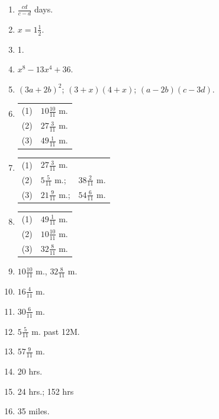 \documentclass{book}
\begin{document}
\begin{enumerate}
\item  $\displaystyle \frac{cd}{c - d}$ days.

\item  $x = 1\frac{1}{2}$.

\item  1.

\item  $x^8 - 13x^4 + 36$.

\item  $(3a + 2b)^2$; $(3 + x)(4 + x)$; $(a - 2b)(c - 3d)$.

\item \begin{tabular}{ll}(1)& $10\frac{10}{11}$ m.   \\
    (2)& $27\frac{3}{11}$ m.   \\
    (3) &$49\frac{1}{11}$ m.
    \end{tabular}

\item \begin{tabular}{lll} (1) &$27\frac{3}{11}$ m.   \\
    (2)& $5\frac{5}{11}$ m.; &$38\frac{2}{11}$ m.   \\
    (3)& $21\frac{9}{11}$ m.; &$54\frac{6}{11}$ m.
    \end{tabular}

\item  \begin{tabular}{ll}(1)& $49\frac{1}{11}$ m.   \\
    (2) & $10\frac{10}{11}$ m.   \\
    (3) & $32\frac{8}{11}$ m.
    \end{tabular}

\item  $10\frac{10}{11}$ m., $32\frac{8}{11}$ m.

\item  $16\frac{4}{11}$ m.

\item  $30\frac{6}{11}$ m.

\item  $5\frac{5}{11}$ m. past 12M.

\item  $57\frac{9}{11}$ m.

\item  20 hrs.

\item  24 hrs.; 152 hrs

\item  35 miles.


\end{enumerate}
\end{document}
